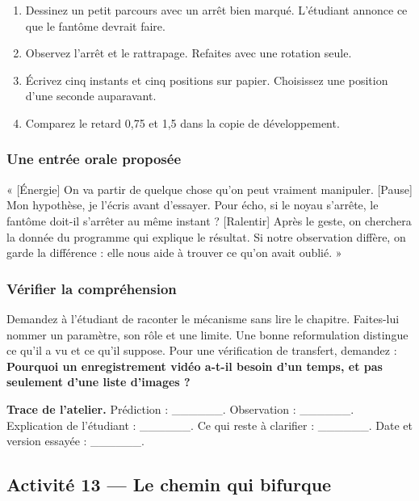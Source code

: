 \documentclass[
  canadien,
  11pt,
  letterpaper,
]{article}
\providecommand{\tightlist}{%
  \setlength{\itemsep}{0pt}\setlength{\parskip}{0pt}}
\begin{document}
\begin{enumerate}
\def\labelenumi{\arabic{enumi}.}
\tightlist
\item
  Dessinez un petit parcours avec un arrêt bien marqué. L'étudiant
  annonce ce que le fantôme devrait faire.
\item
  Observez l'arrêt et le rattrapage. Refaites avec une rotation seule.
\item
  Écrivez cinq instants et cinq positions sur papier. Choisissez une
  position d'une seconde auparavant.
\item
  Comparez le retard 0,75 et 1,5 dans la copie de développement.
\end{enumerate}

\subsubsection{Une entrée orale
proposée}\label{une-entruxe9e-orale-proposuxe9e-11}

« {[}Énergie{]} On va partir de quelque chose qu'on peut vraiment
manipuler. {[}Pause{]} Mon hypothèse, je l'écris avant d'essayer. Pour
écho, si le noyau s'arrête, le fantôme doit-il s'arrêter au même instant
? {[}Ralentir{]} Après le geste, on cherchera la donnée du programme qui
explique le résultat. Si notre observation diffère, on garde la
différence : elle nous aide à trouver ce qu'on avait oublié. »

\subsubsection{Vérifier la
compréhension}\label{vuxe9rifier-la-compruxe9hension-11}

Demandez à l'étudiant de raconter le mécanisme sans lire le chapitre.
Faites-lui nommer un paramètre, son rôle et une limite. Une bonne
reformulation distingue ce qu'il a vu et ce qu'il suppose. Pour une
vérification de transfert, demandez : \textbf{Pourquoi un enregistrement
vidéo a-t-il besoin d'un temps, et pas seulement d'une liste d'images ?}

\textbf{Trace de l'atelier.} Prédiction : \_\_\_\_\_\_. Observation :
\_\_\_\_\_\_. Explication de l'étudiant : \_\_\_\_\_\_. Ce qui reste à
clarifier : \_\_\_\_\_\_. Date et version essayée : \_\_\_\_\_\_.

\subsection{Activité 13 --- Le chemin qui
bifurque}\label{activituxe9-13-le-chemin-qui-bifurque}
\end{document}
